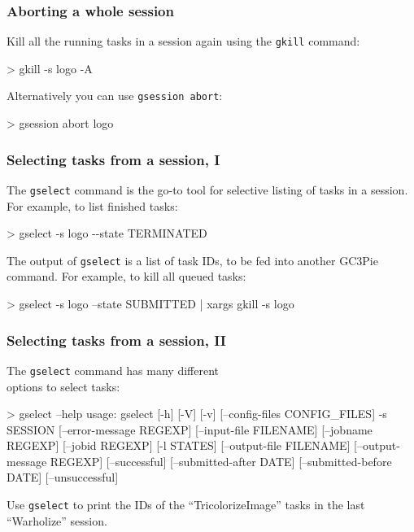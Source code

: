 \documentclass[english,serif,mathserif,usenames,dvipsnames]{beamer}
\begin{document}
\begin{frame}
  \frametitle{Aborting a whole session}

  \alert{Kill all the running tasks} in a session again using the
  \texttt{gkill} command:
\begin{semiverbatim}
    > gkill -s logo -A
\end{semiverbatim}

  Alternatively you can use \texttt{gsession abort}:
\begin{semiverbatim}
    > gsession abort logo
\end{semiverbatim}
\end{frame}


\begin{frame}[fragile]
  \frametitle{Selecting tasks from a session, I}

  The \texttt{gselect} command is the go-to tool for selective listing
  of tasks in a session.  For example, to list finished tasks:
\begin{semiverbatim}
    > gselect -s logo -{}-state TERMINATED
\end{semiverbatim}

  \+ The output of \texttt{gselect} is a list of task IDs, to be fed
  into another GC3Pie command.  For example, to kill all queued tasks:
  \begin{stdout}
    > gselect -s logo --state SUBMITTED | xargs gkill -s logo
  \end{stdout}
\end{frame}

\begin{frame}[fragile]
  \frametitle{Selecting tasks from a session, II}

  The \texttt{gselect} command has many different \\ options to select tasks:
  \begin{stdout}
> gselect --help
usage: gselect [-h] [-V] [-v] [--config-files CONFIG_FILES] -s SESSION
               [--error-message REGEXP] [--input-file FILENAME]
               [--jobname REGEXP] [--jobid REGEXP] [-l STATES]
               [--output-file FILENAME] [--output-message REGEXP]
               [--successful] [--submitted-after DATE]
               [--submitted-before DATE] [--unsuccessful]
  \end{stdout}

  \+
  \begin{exercise*}
    Use \texttt{gselect} to print the IDs of the ``TricolorizeImage''
    tasks in the last ``Warholize'' session.
  \end{exercise*}
\end{frame}
\end{document}
